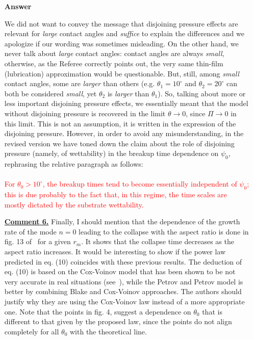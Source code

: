 \documentclass[12pt,english]{article}
\begin{document}
\begin{itemize}
\item[ \textbf{{Answer}}]
{
We did not want to convey the message that disjoining pressure effects are relevant for {\it large} contact angles and {\it suffice} to explain the differences and we apologize if our wording was sometimes misleading. On the other hand, we never talk about {\it large} contact angles: contact angles are always {\it small}, otherwise, as the Referee correctly points out, the very same thin-film (lubrication) approximation would be questionable. But, still, among {\it small} contact angles, some are {\it larger} than others (e.g. $\theta_1=10^{\circ}$ and $\theta_2=20^{\circ}$ can both be considered {\it small}, yet $\theta_2$ is 
{\it larger} than $\theta_1$). So, talking about more or less important 
disjoining pressure effects, we essentially meant that the model without disjoining pressure is recovered in the limit 
$\theta \rightarrow 0$, since $\Pi \rightarrow 0$ in this limit. 
This is not an assumption, it is written in the expression of the disjoining pressure. 
However, in order to avoid any misunderstanding, in the revised version we have toned down the claim about the role 
of disjoining pressure (namely, of wettability) in the breakup time
dependence on $\psi_0$, rephrasing the relative paragraph as follows:\\
\\
\textcolor{red}{For $\theta_0 > 10^{\circ}$,
the breakup times tend to become essentially independent of $\psi_0$; 
this is due probably to the fact that, in this regime, the time scales are 
mostly dictated by the substrate wettability.}

}

\item[ \textbf{\underline{Comment 6.}}]
{
Finally, I should mention that the dependence of the growth rate of the mode $n=0$ leading to the collapse with the aspect ratio is done in fig. 13 of~\cite{gonzalezStabilityLiquidRing2013} for a given $r_m$. It shows that the collapse time decreases as the aspect ratio increases. It would be interesting to show if the power law predicted in eq. (10) coincides with these previous results. The deduction of eq. (10) is based on the Cox-Voinov model that has been shown to be not very accurate in real situations (see~\cite{PhysRevE.95.053111}), while the Petrov and Petrov model is better by combining Blake and Cox-Voinov approaches. The authors should justify why they are using the Cox-Voinov law instead of a more appropriate one. Note that the points in fig. 4, suggest a dependence on $\theta_0$ that is different to that given by the proposed law, since the points do not align completely for all $\theta_0$ with the theoretical line. 
}


\end{itemize}
\end{document}
